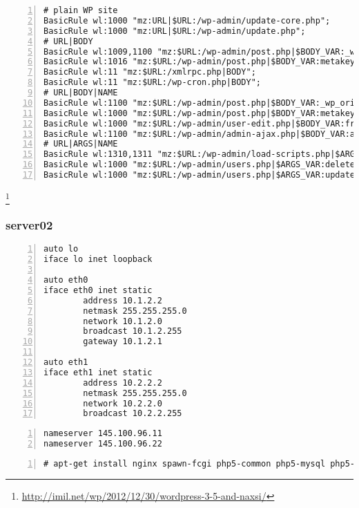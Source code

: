 \documentclass[Configuration]{subfiles}
\begin{document}
\begin{lstlisting}[frame=single,caption=Wordpress whitelist rules,backgroundcolor=\color{gray},breaklines=true,numbers=left,]
# plain WP site
BasicRule wl:1000 "mz:URL|$URL:/wp-admin/update-core.php";
BasicRule wl:1000 "mz:URL|$URL:/wp-admin/update.php";
# URL|BODY
BasicRule wl:1009,1100 "mz:$URL:/wp-admin/post.php|$BODY_VAR:_wp_http_referer";
BasicRule wl:1016 "mz:$URL:/wp-admin/post.php|$BODY_VAR:metakeyselect";
BasicRule wl:11 "mz:$URL:/xmlrpc.php|BODY";
BasicRule wl:11 "mz:$URL:/wp-cron.php|BODY";
# URL|BODY|NAME
BasicRule wl:1100 "mz:$URL:/wp-admin/post.php|$BODY_VAR:_wp_original_http_referer|NAME";
BasicRule wl:1000 "mz:$URL:/wp-admin/post.php|$BODY_VAR:metakeyselect|NAME";
BasicRule wl:1000 "mz:$URL:/wp-admin/user-edit.php|$BODY_VAR:from|NAME";
BasicRule wl:1100 "mz:$URL:/wp-admin/admin-ajax.php|$BODY_VAR:attachment%5burl%5d|NAME";
# URL|ARGS|NAME
BasicRule wl:1310,1311 "mz:$URL:/wp-admin/load-scripts.php|$ARGS_VAR:load[]|NAME";
BasicRule wl:1000 "mz:$URL:/wp-admin/users.php|$ARGS_VAR:delete_count|NAME";
BasicRule wl:1000 "mz:$URL:/wp-admin/users.php|$ARGS_VAR:update|NAME";
\end{lstlisting}\footnote{\url{http://imil.net/wp/2012/12/30/wordpress-3-5-and-naxsi/}}

\newpage
\subsubsection{server02}
\label{sec:server02_configuration}


\begin{lstlisting}[frame=single,caption=/etc/network/interfaces,backgroundcolor=\color{gray},breaklines=true,numbers=left,]
auto lo
iface lo inet loopback

auto eth0
iface eth0 inet static
        address 10.1.2.2
        netmask 255.255.255.0
        network 10.1.2.0
        broadcast 10.1.2.255
        gateway 10.1.2.1

auto eth1
iface eth1 inet static
        address 10.2.2.2
        netmask 255.255.255.0
        network 10.2.2.0
        broadcast 10.2.2.255
\end{lstlisting}

\begin{lstlisting}[frame=single,caption=/etc/resolv.conf,backgroundcolor=\color{gray},breaklines=true,numbers=left,]
nameserver 145.100.96.11
nameserver 145.100.96.22
\end{lstlisting}

\begin{lstlisting}[frame=single,caption=necessary packages,backgroundcolor=\color{gray},breaklines=true,numbers=left,]
# apt-get install nginx spawn-fcgi php5-common php5-mysql php5-xmlrpc php5-cgi php5-curl php5-gd php5-cli  php-apc php-pear php5-dev php5-imap php5-mcrypt
\end{lstlisting}
\end{document}
